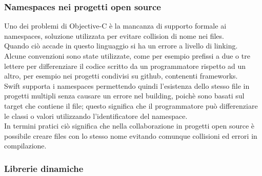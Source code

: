 \subsubsection{Namespaces nei progetti open source}
Uno dei problemi di Objective-C è la mancanza di supporto formale ai namespaces, soluzione utilizzata per evitare collision di nome nei files.\\Quando ciò accade in questo linguaggio si ha un errore a livello di linking.\\Alcune convenzioni sono state utilizzate, come per esempio prefissi a due o tre lettere per differenziare il codice scritto da un programmatore rispetto ad un altro, per esempio nei progetti condivisi su github, contenenti frameworks.\\
Swift supporta i namespaces permettendo quindi l'esistenza dello stesso file in progetti multipli senza causare un errore nel building, poichè sono basati sul target che contiene il file; questo significa che il programmatore può differenziare le classi o valori utilizzando l'identificatore del namespace.\\
In termini pratici ciò significa che nella collaborazione in progetti open source è possibile creare files con lo stesso nome evitando comunque collisioni ed errori in compilazione.\\
\subsubsection{Librerie dinamiche}

